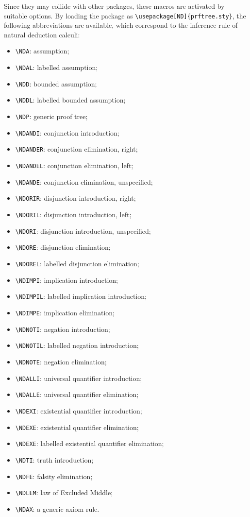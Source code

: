 \documentclass{amsart}
\begin{document}
Since they may collide with other packages, these macros are activated
by suitable options. By loading the package as
\verb|\usepackage[ND]{prftree.sty}|, the following abbreviations are
available, which correspond to the inference rule of natural deduction
calculi:
\begin{itemize}
\item \verb|\NDA|: assumption;
\item \verb|\NDAL|: labelled assumption;
\item \verb|\NDD|: bounded assumption;
\item \verb|\NDDL|: labelled bounded assumption;
\item \verb|\NDP|: generic proof tree;
\item \verb|\NDANDI|: conjunction introduction;
\item \verb|\NDANDER|: conjunction elimination, right;
\item \verb|\NDANDEL|: conjunction elimination, left;
\item \verb|\NDANDE|: conjunction elimination, unspecified;
\item \verb|\NDORIR|: disjunction introduction, right;
\item \verb|\NDORIL|: disjunction introduction, left;
\item \verb|\NDORI|: disjunction introduction, unspecified;
\item \verb|\NDORE|: disjunction elimination;
\item \verb|\NDOREL|: labelled disjunction elimination;
\item \verb|\NDIMPI|: implication introduction;
\item \verb|\NDIMPIL|: labelled implication introduction;
\item \verb|\NDIMPE|: implication elimination;
\item \verb|\NDNOTI|: negation introduction;
\item \verb|\NDNOTIL|: labelled negation introduction;
\item \verb|\NDNOTE|: negation elimination;
\item \verb|\NDALLI|: universal quantifier introduction;
\item \verb|\NDALLE|: universal quantifier elimination;
\item \verb|\NDEXI|: existential quantifier introduction;
\item \verb|\NDEXE|: existential quantifier elimination;
\item \verb|\NDEXE|: labelled existential quantifier elimination;
\item \verb|\NDTI|: truth introduction;
\item \verb|\NDFE|: falsity elimination;
\item \verb|\NDLEM|: law of Excluded Middle;
\item \verb|\NDAX|: a generic axiom rule.
\end{itemize}
\end{document}
